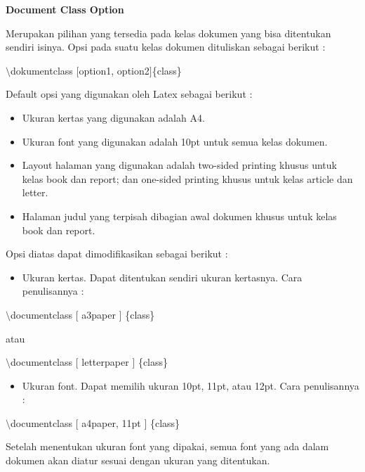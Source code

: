 \textbf{Document Class Option}\par \vspace{12pt}

Merupakan pilihan yang tersedia pada kelas dokumen yang bisa ditentukan sendiri isinya. Opsi pada suatu kelas dokumen dituliskan sebagai berikut :\par \vspace{12pt}

$\setminus$dokumentclass $[$option1, option2$]$\{class\}
\par \vspace{12pt}


Default opsi yang digunakan oleh Latex sebagai berikut :

\begin{itemize}
\item Ukuran kertas yang digunakan adalah A4.
\item Ukuran font yang digunakan adalah 10pt untuk semua kelas dokumen.
\item Layout halaman yang digunakan adalah two-sided printing khusus untuk kelas book dan report; dan one-sided printing khusus untuk kelas article dan letter.
\item Halaman judul yang terpisah dibagian awal dokumen khusus untuk kelas book dan report.
\end{itemize}
Opsi diatas dapat dimodifikasikan sebagai berikut :

\begin{itemize}
\item Ukuran kertas. Dapat ditentukan sendiri ukuran kertasnya. Cara 
penulisannya :
\end{itemize}
\hspace{0,5in}$\setminus$documentclass $[$ a3paper $]$ \{class\}

\hspace{0,5in}atau

\hspace{0,5in}$\setminus$documentclass $[$ letterpaper $]$ \{class\}

\begin{itemize}
\item Ukuran font. Dapat memilih ukuran 10pt, 11pt, atau 12pt. Cara penulisannya :
\end{itemize}
\hspace{0,5in}$\setminus$documentclass $[$ a4paper, 11pt $]$ \{class\}\par \vspace{12pt}

Setelah menentukan ukuran font yang dipakai, semua font yang ada dalam dokumen akan diatur sesuai dengan ukuran yang ditentukan.\par \vspace{12pt}

